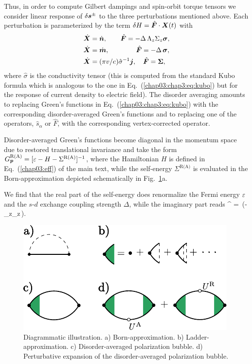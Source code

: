 Thus, in order to compute Gilbert dampings and spin-orbit torque tensors we consider linear response of $\delta\boldsymbol{s}^\pm$ to the three perturbations mentioned above. Each perturbation is parameterized by the term $\delta H=\hat{\boldsymbol{F}}\cdot \boldsymbol{X}(t)$ with
\beml
\label{chap03:chap3:eq:ops}
\begin{align}
&\dot{\boldsymbol{X}}=\dot{\boldsymbol{n}},\qquad \hat{\boldsymbol{F}}=-\Delta\,\Lambda_z\Sigma_z\boldsymbol{\sigma},\\ 
&\dot{\boldsymbol{X}}=\dot{\boldsymbol{m}},\qquad\qquad\hat{\boldsymbol{F}}=-\Delta\, \boldsymbol{\sigma},\\
&\dot{\boldsymbol{X}}=(\pi v/e)\hat{\sigma}^{-1}\boldsymbol{j},\quad \hat{\boldsymbol{F}} =\boldsymbol{\Sigma},
\end{align}
\eml
where $\hat{\sigma}$ is the conductivity tensor (this is computed from the standard Kubo formula which is analogous to the one in Eq.~(\ref{chap03:chap3:eq:kubo}) but for the response of current density to electric field). The disorder averaging amounts to replacing Green's functions in Eq.~(\ref{chap03:chap3:eq:kubo}) with the corresponding disorder-averaged Green's functions and to replacing one of the operators, $\hat{s}_\alpha$ or $\hat{F}$, with the corresponding vertex-corrected operator.

Disorder-averaged Green's functions become diagonal in the momentum space due to restored translational invariance and take the form 
$G^\text{R(A)}_{\boldsymbol{p}} = [\varepsilon-H-\Sigma^\textrm{R(A)}]^{-1}$, where the Hamiltonian $H$ is defined in Eq.~(\ref{chap03:eff}) of the main text, while the self-energy $\Sigma^\text{R(A)}$ is evaluated in the Born-approximation depicted schematically in Fig.~\ref{chap03:fig:diagrams}a. 

We find that the real part of the self-energy does renormalize the Fermi energy $\varepsilon$ and the $s$-$d$ exchange coupling strength $\Delta$, while the imaginary part reads
\be
\im \Sigma^ = \mp{}\,(\ep-\Delta\,\Lambda_z\Sigma_z\,\cdot\bb{\sigma}).
\e

\begin{figure}
\centering
\includegraphics{articles/misha_paper/app5.pdf}
\caption{Diagrammatic illustration. a) Born-approximation. b) Ladder-approximation. c) Disorder-averaged polarization bubble. d) Perturbative expansion of the disorder-averaged polarization bubble. }
\label{chap03:fig:diagrams}
\end{figure}

